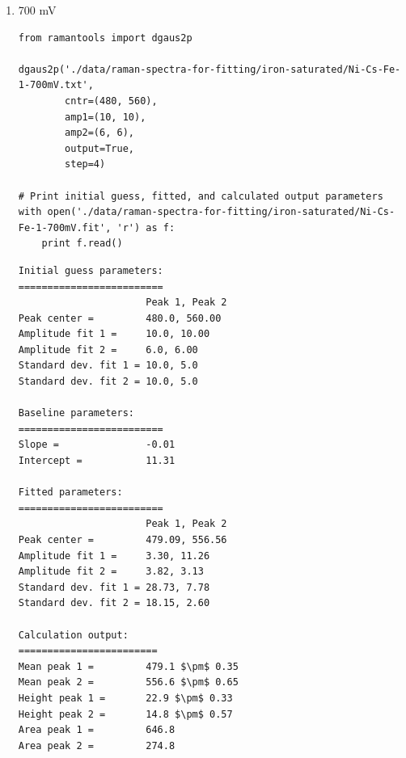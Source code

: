 \documentclass[journal=jpccck,manuscript=suppinfo,email=true]{achemso}
\begin{document}
\begin{enumerate}
\begin{enumerate}
\begin{enumerate}
\begin{verbatim}
Baseline parameters:
=========================
Slope =               -0.01
Intercept =           11.76

Fitted parameters:
=========================
                      Peak 1, Peak 2
Peak center =         477.77, 552.94
Amplitude fit 1 =     8.18, 5.10
Amplitude fit 2 =     2.82, 4.35
Standard dev. fit 1 = 13.42, 4.55
Standard dev. fit 2 = 32.32, 7.02

Calculation output:
========================
Mean peak 1 =         477.8 $\pm$ 0.38
Mean peak 2 =         552.9 $\pm$ 0.81
Height peak 1 =       21.7 $\pm$ 0.46
Height peak 2 =       15.1 $\pm$ 0.34
Area peak 1 =         471.4
Area peak 2 =         430.5
\end{verbatim}

\item 700 mV
\label{sec-4-2-0-2-1-2}
\begin{verbatim}
from ramantools import dgaus2p

dgaus2p('./data/raman-spectra-for-fitting/iron-saturated/Ni-Cs-Fe-1-700mV.txt',
        cntr=(480, 560),
        amp1=(10, 10),
        amp2=(6, 6),
        output=True,
        step=4)

# Print initial guess, fitted, and calculated output parameters
with open('./data/raman-spectra-for-fitting/iron-saturated/Ni-Cs-Fe-1-700mV.fit', 'r') as f:
    print f.read()
\end{verbatim}

\begin{verbatim}
Initial guess parameters:
=========================
                      Peak 1, Peak 2
Peak center =         480.0, 560.00
Amplitude fit 1 =     10.0, 10.00
Amplitude fit 2 =     6.0, 6.00
Standard dev. fit 1 = 10.0, 5.0
Standard dev. fit 2 = 10.0, 5.0

Baseline parameters:
=========================
Slope =               -0.01
Intercept =           11.31

Fitted parameters:
=========================
                      Peak 1, Peak 2
Peak center =         479.09, 556.56
Amplitude fit 1 =     3.30, 11.26
Amplitude fit 2 =     3.82, 3.13
Standard dev. fit 1 = 28.73, 7.78
Standard dev. fit 2 = 18.15, 2.60

Calculation output:
========================
Mean peak 1 =         479.1 $\pm$ 0.35
Mean peak 2 =         556.6 $\pm$ 0.65
Height peak 1 =       22.9 $\pm$ 0.33
Height peak 2 =       14.8 $\pm$ 0.57
Area peak 1 =         646.8
Area peak 2 =         274.8
\end{verbatim}


\end{enumerate}
\end{enumerate}
\end{enumerate}
\end{document}
